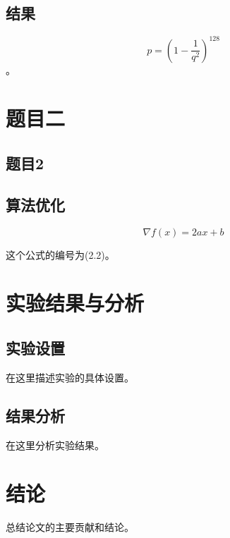 \documentclass[12pt,a4paper]{article}
\numberwithin{equation}{section}
\begin{document}
\subsection{结果}

\begin{equation}
p = \left(1 - \frac{1}{q^2}\right)^{128} \tag{1.1}
\end{equation}。


\section{题目二}

\subsection{题目2}

\subsection{算法优化}

\begin{equation}
\nabla f(x) = 2ax + b
\end{equation}

这个公式的编号为(2.2)。

\section{实验结果与分析}

\subsection{实验设置}

在这里描述实验的具体设置。

\subsection{结果分析}

在这里分析实验结果。

\section{结论}

总结论文的主要贡献和结论。
\end{document}
